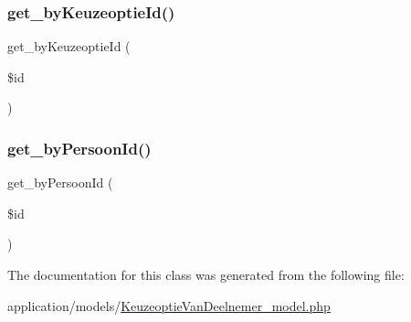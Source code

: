 \subsubsection{\texorpdfstring{get\+\_\+by\+Keuzeoptie\+Id()}{get\_byKeuzeoptieId()}}
{\footnotesize\ttfamily get\+\_\+by\+Keuzeoptie\+Id (\begin{DoxyParamCaption}\item[{}]{\$id }\end{DoxyParamCaption})}

\mbox{\label{class_keuzeoptie_van_deelnemer___model_aa04bd86e024fed6b73b051c9cbb9ec52}} 
\subsubsection{\texorpdfstring{get\+\_\+by\+Persoon\+Id()}{get\_byPersoonId()}}
{\footnotesize\ttfamily get\+\_\+by\+Persoon\+Id (\begin{DoxyParamCaption}\item[{}]{\$id }\end{DoxyParamCaption})}



The documentation for this class was generated from the following file\+:\begin{DoxyCompactItemize}
\item 
application/models/\mbox{\hyperlink{_keuzeoptie_van_deelnemer__model_8php}{Keuzeoptie\+Van\+Deelnemer\+\_\+model.\+php}}\end{DoxyCompactItemize}
